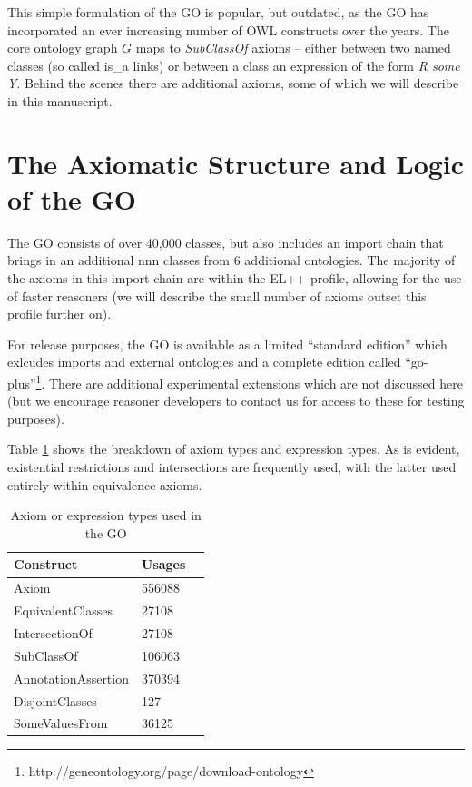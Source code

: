 \documentclass{llncs}
\begin{document}
This simple formulation of the GO is popular, but outdated, as the GO
has incorporated an ever increasing number of OWL constructs over the
years. The core ontology graph $G$ maps to \emph{SubClassOf} axioms --
either between two named classes (so called is\_a links) or between a
class an expression of the form \emph{R some Y}. Behind the scenes
there are additional axioms, some of which we will describe in this
manuscript.

\section{The Axiomatic Structure and Logic of the GO}

The GO consists of over 40,000 classes, but also includes an import
chain that brings in an additional nnn classes from 6 additional
ontologies. The majority of the axioms in this import chain are within
the EL++ profile, allowing for the use of faster reasoners (we will
describe the small number of axioms outset this profile further on).

For release purposes, the GO is available as a limited ``standard
edition'' which exlcudes imports and external ontologies and a
complete edition called
``go-plus''\footnote{http://geneontology.org/page/download-ontology}. There
are additional experimental extensions which are not discussed here
(but we encourage reasoner developers to contact us for access to
these for testing purposes).

Table \ref{tab:constructs} shows the breakdown of axiom types and
expression types. As is evident, existential restrictions and
intersections are frequently used, with the latter used entirely
within equivalence axioms.

\begin{table}
\begin{tabular}{ | p{4cm} | p{3cm} | p{4cm} }
\hline
\textbf{Construct} & \textbf{Usages}  \\
\hline
Axiom & 556088 \\
EquivalentClasses & 27108 \\
IntersectionOf & 27108 \\
SubClassOf & 106063 &  \\
AnnotationAssertion & 370394 \\
DisjointClasses & 127 \\
SomeValuesFrom & 36125 \\
\hline
\end{tabular}
\caption{Axiom or expression types used in the GO }
\label{tab:constructs}
\end{table}
\end{document}
